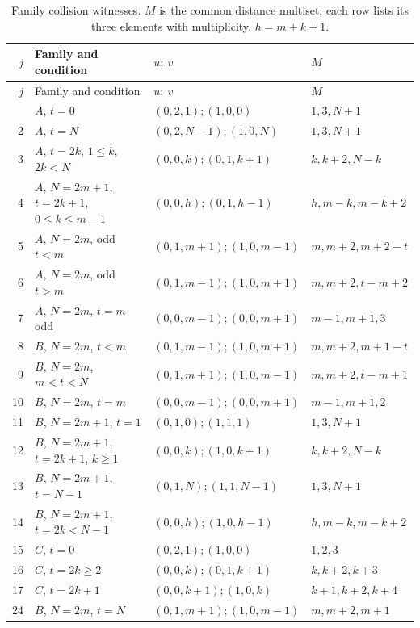 \documentclass[11pt,a4paper]{article}
\begin{document}
\begingroup\small\setlength{\tabcolsep}{4pt}
\begin{longtable}{@{}r p{48mm} l l@{}}
\caption{Family collision witnesses. $M$ is the common distance multiset; each row lists its three elements with multiplicity. $h=m+k+1$.}\label{tab:abc}\\
\toprule
$j$ & Family and condition & $u;\ v$ & $M$ \\
\midrule\endfirsthead
\toprule $j$ & Family and condition & $u;\ v$ & $M$ \\\midrule\endhead
\bottomrule\endfoot
1 & $A$, $t=0$ & $(0,2,1);(1,0,0)$ & $1,3,N+1$\\[3pt]
2 & $A$, $t=N$ & $(0,2,N-1);(1,0,N)$ & $1,3,N+1$\\[3pt]
3 & $A$, $t=2k$, $1\le k$, $2k<N$ & $(0,0,k);(0,1,k+1)$ & $k,k+2,N-k$\\[3pt]
4 & $A$, $N=2m+1$, $t=2k+1$, $0\le k\le m-1$ & $(0,0,h);(0,1,h-1)$ & $h,m-k,m-k+2$\\[3pt]
5 & $A$, $N=2m$, odd $t<m$ & $(0,1,m+1);(1,0,m-1)$ & $m,m+2,m+2-t$\\[3pt]
6 & $A$, $N=2m$, odd $t>m$ & $(0,1,m-1);(1,0,m+1)$ & $m,m+2,t-m+2$\\[3pt]
7 & $A$, $N=2m$, $t=m$ odd & $(0,0,m-1);(0,0,m+1)$ & $m-1,m+1,3$\\[3pt]
8 & $B$, $N=2m$, $t<m$ & $(0,1,m-1);(1,0,m+1)$ & $m,m+2,m+1-t$\\[3pt]
9 & $B$, $N=2m$, $m<t<N$ & $(0,1,m+1);(1,0,m-1)$ & $m,m+2,t-m+1$\\[3pt]
10 & $B$, $N=2m$, $t=m$ & $(0,0,m-1);(0,0,m+1)$ & $m-1,m+1,2$\\[3pt]
11 & $B$, $N=2m+1$, $t=1$ & $(0,1,0);(1,1,1)$ & $1,3,N+1$\\[3pt]
12 & $B$, $N=2m+1$, $t=2k+1$, $k\ge1$ & $(0,0,k);(1,0,k+1)$ & $k,k+2,N-k$\\[3pt]
13 & $B$, $N=2m+1$, $t=N-1$ & $(0,1,N);(1,1,N-1)$ & $1,3,N+1$\\[3pt]
14 & $B$, $N=2m+1$, $t=2k<N-1$ & $(0,0,h);(1,0,h-1)$ & $h,m-k,m-k+2$\\[3pt]
15 & $C$, $t=0$ & $(0,2,1);(1,0,0)$ & $1,2,3$\\[3pt]
16 & $C$, $t=2k\ge2$ & $(0,0,k);(0,1,k+1)$ & $k,k+2,k+3$\\[3pt]
17 & $C$, $t=2k+1$ & $(0,0,k+1);(1,0,k)$ & $k+1,k+2,k+4$\\[3pt]
24 & $B$, $N=2m$, $t=N$ & $(0,1,m+1);(1,0,m-1)$ & $m,m+2,m+1$\\
\end{longtable}\endgroup
\end{document}
